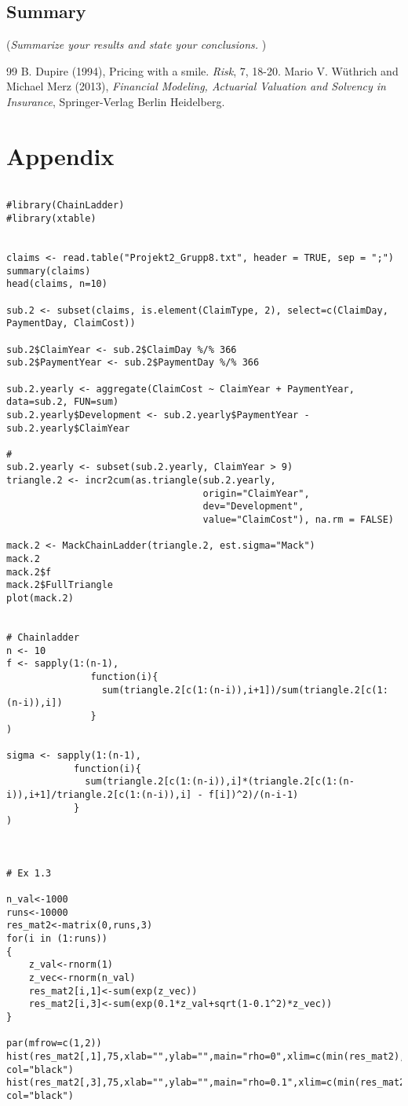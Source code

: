 \documentclass[a4paper]{article}
\begin{document}
\subsection*{Summary}
({\it Summarize your results and state your conclusions. })



\begin{thebibliography}{99}
B. Dupire (1994),
Pricing with a smile.
\emph{Risk}, 7, 18-20.
  Mario V. W\"{u}thrich and Michael Merz (2013),
  \emph{Financial Modeling, Actuarial Valuation and Solvency in Insurance},
  Springer-Verlag Berlin Heidelberg.
\end{thebibliography}


\section*{Appendix}

\begin{verbatim}

#library(ChainLadder)
#library(xtable)


claims <- read.table("Projekt2_Grupp8.txt", header = TRUE, sep = ";")
summary(claims)
head(claims, n=10)

sub.2 <- subset(claims, is.element(ClaimType, 2), select=c(ClaimDay, PaymentDay, ClaimCost))

sub.2$ClaimYear <- sub.2$ClaimDay %/% 366
sub.2$PaymentYear <- sub.2$PaymentDay %/% 366

sub.2.yearly <- aggregate(ClaimCost ~ ClaimYear + PaymentYear, data=sub.2, FUN=sum)
sub.2.yearly$Development <- sub.2.yearly$PaymentYear - sub.2.yearly$ClaimYear

#
sub.2.yearly <- subset(sub.2.yearly, ClaimYear > 9)
triangle.2 <- incr2cum(as.triangle(sub.2.yearly,
                                   origin="ClaimYear",
                                   dev="Development",
                                   value="ClaimCost"), na.rm = FALSE)

mack.2 <- MackChainLadder(triangle.2, est.sigma="Mack")
mack.2
mack.2$f
mack.2$FullTriangle
plot(mack.2)


# Chainladder
n <- 10
f <- sapply(1:(n-1),
               function(i){
                 sum(triangle.2[c(1:(n-i)),i+1])/sum(triangle.2[c(1:(n-i)),i])
               }
)

sigma <- sapply(1:(n-1),
            function(i){
              sum(triangle.2[c(1:(n-i)),i]*(triangle.2[c(1:(n-i)),i+1]/triangle.2[c(1:(n-i)),i] - f[i])^2)/(n-i-1)
            }
)



# Ex 1.3

n_val<-1000
runs<-10000
res_mat2<-matrix(0,runs,3)
for(i in (1:runs))
{
	z_val<-rnorm(1)
	z_vec<-rnorm(n_val)
	res_mat2[i,1]<-sum(exp(z_vec))
	res_mat2[i,3]<-sum(exp(0.1*z_val+sqrt(1-0.1^2)*z_vec))
}

par(mfrow=c(1,2))
hist(res_mat2[,1],75,xlab="",ylab="",main="rho=0",xlim=c(min(res_mat2),max(res_mat2)),
col="black")
hist(res_mat2[,3],75,xlab="",ylab="",main="rho=0.1",xlim=c(min(res_mat2),max(res_mat2)),
col="black")
\end{verbatim}
\end{document}
